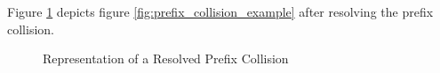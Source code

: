Figure \ref{fig:prefix_collision_example_renamed} depicts figure \ref{fig:prefix_collision_example} after resolving the prefix collision.

\begin{figure}[H]
    \caption{Representation of a Resolved Prefix Collision}
    \label{fig:prefix_collision_example_renamed}
\end{figure}







